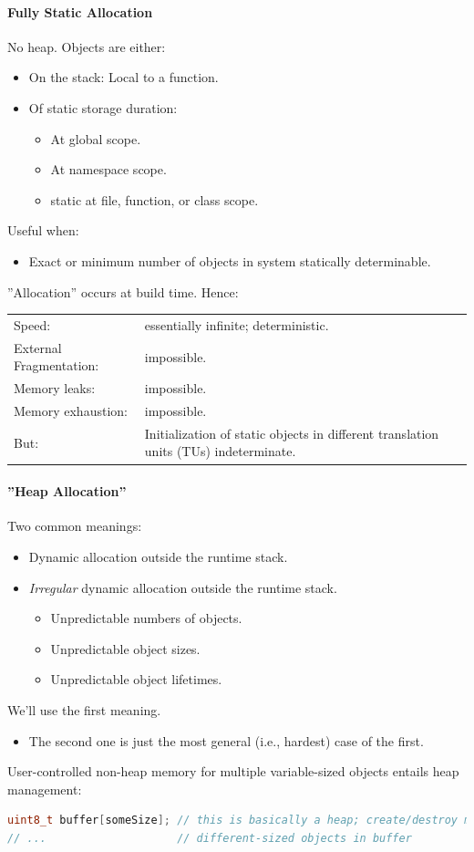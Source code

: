 \paragraph{Fully Static Allocation}
No heap. Objects are either:
\begin{itemize}
  \item On the stack: Local to a function.
  \item Of static storage duration:
  \begin{itemize}
    \item At global scope.
    \item At namespace scope.
    \item static at file, function, or class scope.
  \end{itemize}
\end{itemize}
Useful when:
\begin{itemize}
  \item Exact or minimum number of objects in system statically determinable.
\end{itemize}

''Allocation'' occurs at build time. Hence:\\
\begin{tabular}{|l|p{7cm}|}
  \hline
  Speed: & essentially infinite; deterministic.\\
  External Fragmentation: & impossible.\\
  Memory leaks: & impossible.\\
  Memory exhaustion: & impossible.\\
  But: & Initialization of static objects in different translation units (TUs) indeterminate.\\
  \hline
\end{tabular}

\paragraph{''Heap Allocation''}
Two common meanings:
\begin{itemize}
  \item Dynamic allocation outside the runtime stack.
  \item \textit{Irregular} dynamic allocation outside the runtime stack.
  \begin{itemize}
    \item Unpredictable numbers of objects.
    \item Unpredictable object sizes.
    \item Unpredictable object lifetimes.
  \end{itemize}
\end{itemize}
We'll use the first meaning.
\begin{itemize}
  \item The second one is just the most general (i.e., hardest) case of the first.
\end{itemize}
User-controlled non-heap memory for multiple variable-sized objects entails heap management:
\begin{lstlisting}[language=C++]
uint8_t buffer[someSize]; // this is basically a heap; create/destroy multiple
// ...                    // different-sized objects in buffer
\end{lstlisting}

